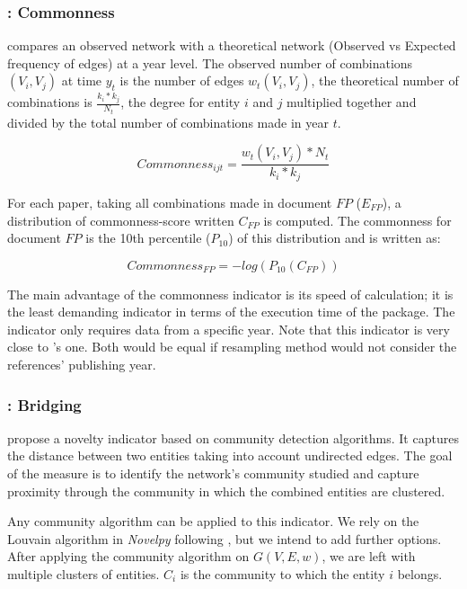 \subsubsection{\cite{lee2015creativity}: Commonness}

\cite{lee2015creativity} compares an observed network with a theoretical network (Observed vs Expected frequency of edges) at a year level. The observed number of combinations $(V_i, V_j)$ at time $y_t$ is the number of edges $w_t(V_i, V_j)$, the theoretical number of combinations is $\frac{k_i*k_j}{N_t}$, the degree for entity $i$ and $j$ multiplied together and divided by the total number of combinations made in year $t$.

\begin{figure}[h!]
  \centering
  
  \caption{\cite{lee2015creativity}}
\end{figure}

$$ Commonness_{ijt} = \frac{w_t(V_i,V_j)*N_t}{k_i*k_j} $$


For each paper, taking all combinations made in document $FP$ ($E_{FP}$), a distribution of commonness-score written $C_{FP}$ is computed. The commonness for document $FP$ is the 10th percentile ($P_{10}$) of this distribution and is written as:

$$Commonness_{FP} = -log(P_{10}(C_{FP}))$$


The main advantage of the commonness indicator is its speed of calculation; it is the least demanding indicator in terms of the execution time of the package. The indicator only requires data from a specific year. Note that this indicator is very close to \cite{uzzi2013atypical}'s one. Both would be equal if \cite{uzzi2013atypical} resampling method would not consider the references' publishing year.



\subsubsection{\cite{foster2015tradition}: Bridging}

\cite{foster2015tradition} propose a novelty indicator based on community detection algorithms. It captures the distance between two entities taking into account undirected edges. The goal of the measure is to identify the network's community studied and capture proximity through the community in which the combined entities are clustered.

Any community algorithm can be applied to this indicator. We rely on the Louvain algorithm in \textit{Novelpy} following \cite{foster2021surprise}, but we intend to add further options. After applying the community algorithm on $G(V, E,w)$, we are left with multiple clusters of entities. $C_i$ is the community to which the entity $i$ belongs.

